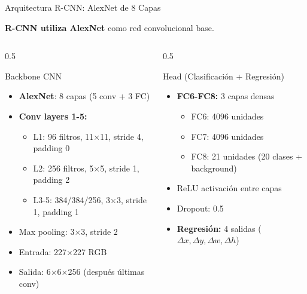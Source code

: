 \documentclass[aspectratio=169, 10pt]{beamer}
\begin{document}
\begin{frame}[shrink]{Arquitectura R-CNN: AlexNet de 8 Capas}

	\textbf{R-CNN utiliza AlexNet} como red convolucional base.

	\vspace{0.2cm}

	\begin{columns}[T]
		\begin{column}{0.5\textwidth}
			\begin{block}{Backbone CNN}
				\small
				\begin{itemize}
					\item \textbf{AlexNet}: 8 capas (5 conv + 3 FC)
					\item \textbf{Conv layers 1-5:}
					\begin{itemize}
						\item L1: 96 filtros, 11×11, stride 4, padding 0
						\item L2: 256 filtros, 5×5, stride 1, padding 2
						\item L3-5: 384/384/256, 3×3, stride 1, padding 1
					\end{itemize}
					\item Max pooling: 3×3, stride 2
					\item Entrada: 227×227 RGB
					\item Salida: 6×6×256 (despu\'es \'ultimas conv)
				\end{itemize}
			\end{block}
		\end{column}

		\begin{column}{0.5\textwidth}
			\begin{block}{Head (Clasificaci\'on + Regresi\'on)}
				\small
				\begin{itemize}
					\item \textbf{FC6-FC8:} 3 capas densas
					\begin{itemize}
						\item FC6: 4096 unidades
						\item FC7: 4096 unidades
						\item FC8: 21 unidades (20 clases + background)
					\end{itemize}
					\item ReLU activaci\'on entre capas
					\item Dropout: 0.5
					\item \textbf{Regresi\'on:} 4 salidas ($\Delta x, \Delta y, \Delta w, \Delta h$)
				\end{itemize}
			\end{block}
		\end{column}
	\end{columns}

\end{frame}
\end{document}
